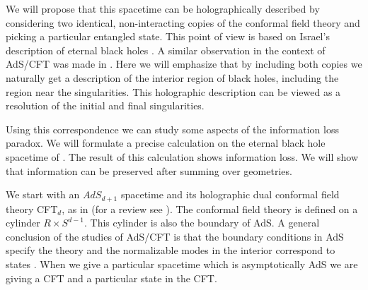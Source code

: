  We will  propose that this spacetime
can be holographically described by considering two identical, 
non-interacting copies of the conformal field theory and picking a 
particular entangled state. This point of view is based on 
Israel's description of eternal black holes \israel . 
 A similar observation in the context of AdS/CFT  was made in 
.  
Here we will emphasize that by including both copies
we naturally get a description of the interior region of black holes, 
including the region near the singularities.
This holographic description can be viewed as a resolution of the 
initial and final singularities. 



Using this correspondence we can study some aspects of the information 
loss paradox. 
 We will formulate a precise calculation
on  the eternal black hole spacetime of  \penrose . The
result of this calculation  shows information loss. We will 
show that  information can be  preserved after summing over geometries. 



We  start with an $AdS_{d+1}$ spacetime  and its holographic dual 
conformal field theory CFT$_d$, as in 
(for a review see \review ).
The conformal field theory is defined on a cylinder $R\times S^{d-1}$.
This cylinder is also the boundary of AdS. 
A general conclusion of the studies of AdS/CFT is that the boundary 
conditions in AdS specify the theory and the  normalizable
modes in the interior correspond to  states .
 When we give a 
particular spacetime which is asymptotically AdS we are giving a CFT and
a particular state in the CFT.  

\ifig{}
{}

